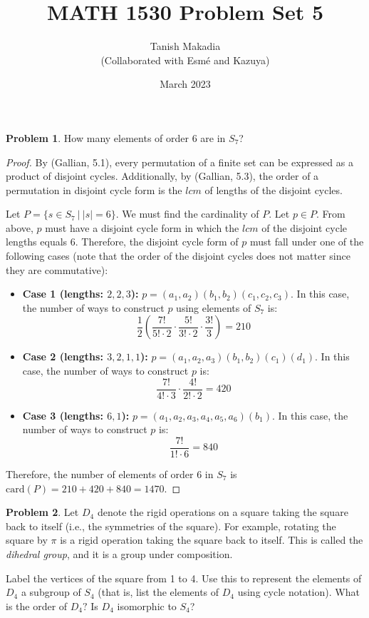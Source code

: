 \documentclass[12pt,reqno]{article}
\title{MATH 1530 Problem Set 5}
\author{Tanish Makadia\\\small{(Collaborated with Esmé and Kazuya)}}
\date{March 2023}
\theoremstyle{plain}
\theoremstyle{definition}
\newtheorem{problem}{Problem}
\begin{document}
\maketitle


\begin{problem} 
    How many elements of order 6 are in $S_7$?
\end{problem}

\begin{proof}
    By (Gallian, 5.1), every permutation of a finite set can be expressed as a product of
    disjoint cycles. Additionally, by (Gallian, 5.3), the order of a permutation in disjoint
    cycle form is the \(lcm\) of lengths of the disjoint cycles. 
    
    Let \(P = \{s\in S_7\ |\ |s|=6\}\). We must find the cardinality of \(P\). Let \(p\in P\). From above, \(p\) must have a disjoint cycle form in which the \(lcm\) of
    the disjoint cycle lengths equals \(6\). Therefore, the disjoint cycle form of \(p\) must fall under one
    of the following cases (note that the order of the disjoint cycles does not matter since they are commutative):
    \begin{itemize}
        \item \textbf{Case 1 (lengths: \(2, 2, 3\)):} \(p = (a_1, a_2)(b_1, b_2)(c_1, c_2, c_3)\). In this case, the number of ways to construct \(p\) using
        elements of \(S_7\) is:
        \[\frac{1}{2}\left(\frac{7!}{5!\cdot 2}\cdot\frac{5!}{3!\cdot 2}\cdot\frac{3!}{3}\right)=210\]
        \item \textbf{Case 2 (lengths: \(3,2,1,1\)):} \(p = (a_1,a_2,a_3)(b_1,b_2)(c_1)(d_1)\). In this case, the number of ways to construct
        \(p\) is:
        \[\frac{7!}{4!\cdot 3}\cdot\frac{4!}{2!\cdot 2}=420\]
        \item \textbf{Case 3 (lengths: \(6,1\)):} \(p=(a_1,a_2,a_3,a_4,a_5,a_6)(b_1)\). In this case, the number of ways to construct
        \(p\) is:
        \[\frac{7!}{1!\cdot 6}=840\]
    \end{itemize}
    Therefore, the number of elements of order \(6\) in \(S_7\) is \(\mathrm{card}(P)=210+420+840=1470\).
\end{proof}

\newpage


\begin{problem} 
    Let $D_4$ denote the rigid operations on a square taking the square back to itself (i.e., the symmetries of the square). For example, rotating the square by $\pi$ is a rigid operation taking the square back to itself. This is called the \emph{dihedral group}, and it is a group under composition.
    
    Label the vertices of the square from 1 to 4. Use this to represent the elements of $D_4$ a subgroup of $S_4$ (that is, list the elements of $D_4$ using cycle notation). What is the order of $D_4?$ Is $D_4$ isomorphic to $S_4$?
\end{problem}
\end{document}
